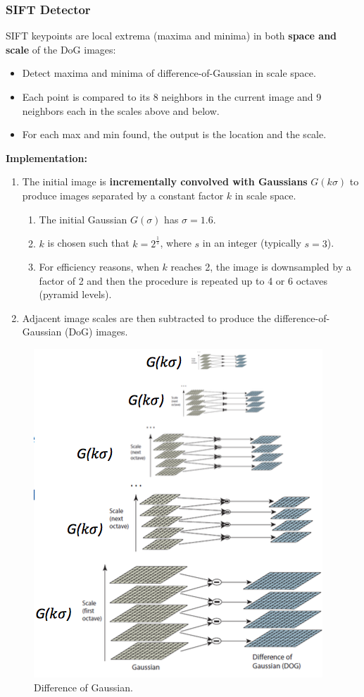 \documentclass[a4paper,12 pt]{article}
\theoremstyle{definition}
\theoremstyle{remark}
\theoremstyle{definition}
\theoremstyle{definition}
\theoremstyle{definition}
\theoremstyle{remark}
\theoremstyle{definition}
\begin{document}
\subsubsection*{SIFT Detector}
SIFT keypoints are local extrema (maxima and minima) in both \textbf{space and scale} of the DoG images: 
\begin{itemize}
\item Detect maxima and minima of difference-of-Gaussian in scale space.
\item Each point is compared to its 8 neighbors in the current image and 9 neighbors each in the scales above and below.
\item For each max and min found, the output is the location and the scale.
\end{itemize}
\textbf{Implementation:} 
\begin{enumerate}
\item The initial image is \textbf{incrementally convolved with Gaussians} $G(k\sigma)$ to produce images separated by a constant factor $k$ in scale space.
\begin{enumerate}
\item The initial Gaussian $G(\sigma)$ has $\sigma=1.6$.
\item $k$ is chosen such that $k=2^{\frac{1}{s}}$, where $s$ in an integer (typically $s=3$).
\item For efficiency reasons, when $k$ reaches 2, the image is downsampled by a factor of 2 and then the procedure is repeated up to 4 or 6 octaves (pyramid levels).
\end{enumerate}
\item Adjacent image scales are then subtracted to produce the difference-of-Gaussian (DoG) images.
\end{enumerate}
\begin{figure}[tbh]
\begin{center}
\includegraphics[scale=0.6]{pics/sift}
\caption{Difference of Gaussian. \label{fig:sift}}
\end{center}
\end{figure}
\end{document}
